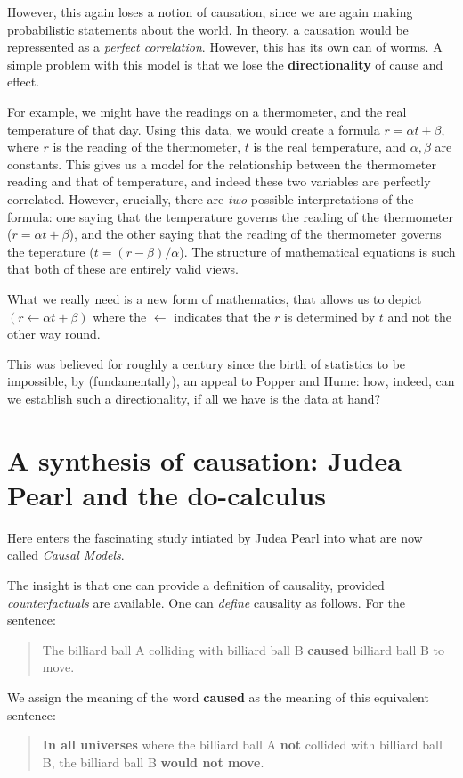 \documentclass{article}
\begin{document}
However, this again loses a notion of causation, since we are again making
probabilistic statements about the world. In theory, a causation would be
repressented as a \textit{perfect correlation}. However, this has its own can
of worms. A simple problem with this model is that we lose the \textbf{directionality}
of cause and effect.

For example, we might have the readings on a thermometer, and the real temperature
of that day. Using this data, we would create a formula $r = \alpha t + \beta$,
where $r$ is the reading of the thermometer, $t$ is the real temperature, and
$\alpha, \beta$ are constants. This gives us a model for the relationship between
the thermometer reading and that of temperature, and indeed these two variables
are perfectly correlated. However, crucially, there are \textit{two} possible
interpretations of the formula: one saying that the temperature governs the
reading of the thermometer ($r = \alpha t + \beta$), and the other saying that
the reading of the thermometer governs the teperature ($t = (r - \beta) /
\alpha$). The structure of mathematical equations is such that both of these
are entirely valid views.

What we really need is a new form of mathematics, that allows us to depict
$(r \leftarrow \alpha t + \beta )$ where the $\leftarrow$ indicates that
the $r$ is determined by $t$ and not the other way round.


This was believed for roughly a century since the birth of statistics to be
impossible, by (fundamentally), an appeal to Popper and Hume: how, indeed,
can we establish such a directionality, if all we have is the data at hand?

\section{A synthesis of causation: Judea Pearl and the do-calculus}

Here enters the fascinating study intiated by Judea Pearl into what are now
called \emph{Causal Models}. 

The insight is that one can provide a definition of causality, provided
\emph{counterfactuals} are available. One can \textit{define} causality 
as follows. For the sentence:
\begin{quote}
    The billiard ball A colliding with billiard ball B \textbf{caused} billiard ball B to move.
\end{quote}
We assign the meaning of the word \textbf{caused} as the meaning of this
equivalent sentence:
\begin{quote}
    \textbf{In all universes} where the billiard ball A \textbf{not} collided with
    billiard ball B, the billiard ball B \textbf{would not move}.
\end{quote}
\end{document}
